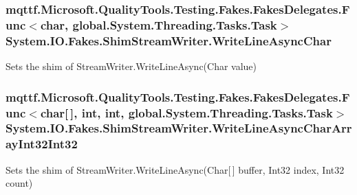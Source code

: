 \hypertarget{class_system_1_1_i_o_1_1_fakes_1_1_shim_stream_writer_a68aa8f1148344ec97461f7e5c5c508b0}{
\subsubsection[{Write\-Line\-Async\-Char}]{\setlength{\rightskip}{0pt plus 5cm}mqttf.\-Microsoft.\-Quality\-Tools.\-Testing.\-Fakes.\-Fakes\-Delegates.\-Func$<$char, global.\-System.\-Threading.\-Tasks.\-Task$>$ System.\-I\-O.\-Fakes.\-Shim\-Stream\-Writer.\-Write\-Line\-Async\-Char\hspace{0.3cm}{\ttfamily [set]}}}\label{class_system_1_1_i_o_1_1_fakes_1_1_shim_stream_writer_a68aa8f1148344ec97461f7e5c5c508b0}


Sets the shim of Stream\-Writer.\-Write\-Line\-Async(\-Char value)

\hypertarget{class_system_1_1_i_o_1_1_fakes_1_1_shim_stream_writer_ab0a3088e112bcac17de6a38de299bfc0}{
\subsubsection[{Write\-Line\-Async\-Char\-Array\-Int32\-Int32}]{\setlength{\rightskip}{0pt plus 5cm}mqttf.\-Microsoft.\-Quality\-Tools.\-Testing.\-Fakes.\-Fakes\-Delegates.\-Func$<$char\mbox{[}$\,$\mbox{]}, int, int, global.\-System.\-Threading.\-Tasks.\-Task$>$ System.\-I\-O.\-Fakes.\-Shim\-Stream\-Writer.\-Write\-Line\-Async\-Char\-Array\-Int32\-Int32\hspace{0.3cm}{\ttfamily [set]}}}\label{class_system_1_1_i_o_1_1_fakes_1_1_shim_stream_writer_ab0a3088e112bcac17de6a38de299bfc0}


Sets the shim of Stream\-Writer.\-Write\-Line\-Async(\-Char\mbox{[}$\,$\mbox{]} buffer, Int32 index, Int32 count)

